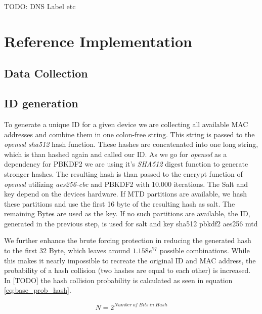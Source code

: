    TODO: DNS Label etc \cite{mockapetris_domain_1987}
\newpage


\section{Reference Implementation}
\label{sec:software_design:ref_impl}

%
\subsection{Data Collection}

%
\subsection{ID generation}
    To generate a unique ID for a given device we are collecting all available MAC addresses and combine them in one colon-free string. This string is passed to the \textit{openssl sha512} hash function. These hashes are concatenated into one long string, which is than hashed again and called our ID. As we go for \textit{openssl} as a dependency for PBKDF2 we are using it's \textit{SHA512} digest function to generate stronger hashes. The resulting hash is than passed to the encrypt function of \textit{openssl} utilizing \textit{aes256-cbc} and PBKDF2 with 10.000 iterations.
    The Salt and key depend on the devices hardware. If MTD partitions are available, we hash these partitions and use the first 16 byte of the resulting hash as salt. The remaining Bytes are used as the key. If no such partitions are available, the ID, generated in the  previous step, is used for salt and key
     sha512
     pbkdf2
     aes256
     mtd 
     
     We further enhance the brute forcing protection in reducing the generated hash to the first 32 Byte, which leaves around $1.158e^{77}$ possible combinations. While this makes it nearly impossible to recreate the original ID and MAC address, the probability of a hash collision (two hashes are equal to each other) is increased. In [TODO] the hash collision probability is calculated as seen in equation \ref{eq:base_prob_hash}.
     
     \begin{equation*}
         N = 2^{Number\ of\ Bits\ in\ Hash}
     \end{equation*}
     
